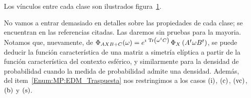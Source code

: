 %
Los v\'inculos entre cada clase son ilustrados figura~\ref{Fig:MP:EDMatrix}.
%
%
\begin{figure}[h!]
\begin{center}  \end{center}
% 
\label{Fig:MP:EDMatrix}
\end{figure}


No vamos a entrar demasiado en  detalles sobre las propiedades de cada clase; se
encuentran en las referencias citadas.  Las daremos sin pruebas para la mayoria.
Notamos que, nuevamente,  de $\Phi_{A X B + C}(\omega)  = e^{\imath \, \operatorname{Tr}\left(
    \omega^t  C \right)}  \,  \Phi_X\left(  A^t \omega  B^t  \right)$, se  puede
deducir la  funci\'on caracter\'istica de  una matriz a simetr\'ia  el\'iptica a
partir de la funci\'on  caracter\'istica del contexto esf\'erico, y similarmente
para la  densidad de  probabilidad cuando la  medida de probabilidad  admite una
densidad.  Adem\'as,  del item~\ref{Enum:MP:EDM_Traspuesta} nos  restringimos a
los casos $(\mathrm{i})$, $(\mathrm{c})$, $(\mathrm{vc})$, $(\mathrm{b})$ y $(\mathrm{s})$.

